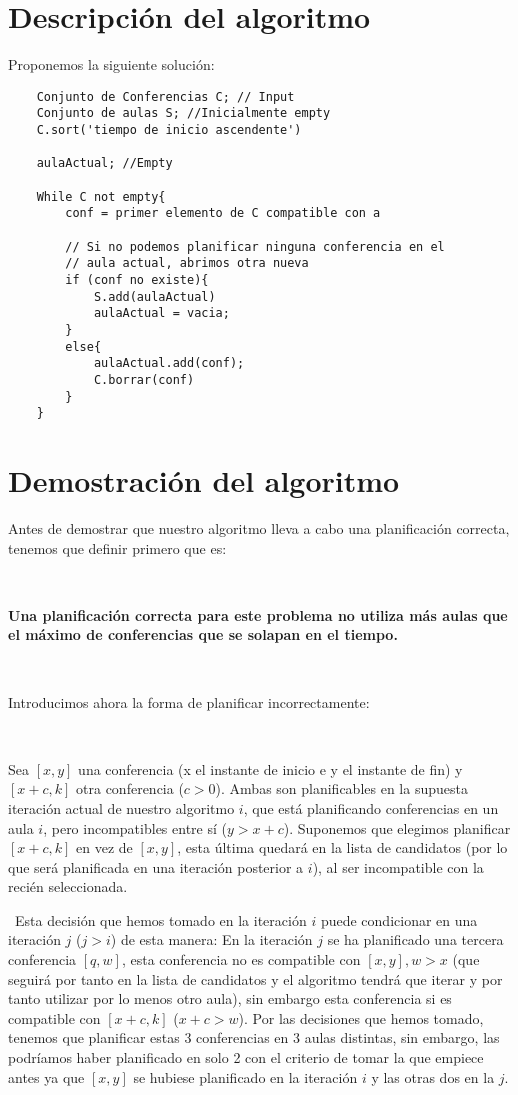 \documentclass{article}
\begin{document}
	\section{Descripción del algoritmo}
	Proponemos la siguiente solución:
	\begin{lstlisting}
	Conjunto de Conferencias C; // Input 
	Conjunto de aulas S; //Inicialmente empty
	C.sort('tiempo de inicio ascendente')
	
	aulaActual; //Empty
	
	While C not empty{
		conf = primer elemento de C compatible con a
		
		// Si no podemos planificar ninguna conferencia en el
		// aula actual, abrimos otra nueva
		if (conf no existe){
			S.add(aulaActual)
			aulaActual = vacia;
		}
		else{
 			aulaActual.add(conf);
			C.borrar(conf)
		}
	}
	\end{lstlisting}
	
	\section{Demostración del algoritmo}
	 Antes de demostrar que nuestro algoritmo lleva a cabo una planificación correcta, tenemos que definir primero que es:
	 
	 \
	 
	\textbf{ Una planificación correcta para este problema no utiliza más aulas que el máximo de conferencias que se solapan en el tiempo.}
	
	\
	
	Introducimos ahora la forma de planificar incorrectamente:
	
	\
	
	
	Sea $[x,y]$ una conferencia (x el instante de inicio e y el instante de fin) y $[x+c, k]$ otra conferencia ($c > 0$).
	Ambas son planificables en la supuesta iteración actual de nuestro algoritmo $i$, que está planificando conferencias en un aula $i$, pero incompatibles entre sí ($y > x+c$).
	Suponemos que elegimos planificar $[x+c, k]$ en vez de $[x, y]$, esta última quedará en la lista de candidatos (por lo que será planificada en una iteración posterior a $i$), al ser incompatible con la recién seleccionada.
	
	\
	Esta decisión que hemos tomado en la iteración $i$ puede condicionar en una iteración $j$ ($j > i$) de esta manera: En la iteración $j$ se ha planificado una tercera conferencia $[q, w]$, esta conferencia no es compatible con $[x,y], w > x$ (que seguirá por tanto en la lista de candidatos y el algoritmo tendrá que iterar y por tanto utilizar por lo menos otro aula), sin embargo esta conferencia si es compatible con $[x+c, k]$ ($x+c > w$). Por las decisiones que hemos tomado, tenemos que planificar estas 3 conferencias en 3 aulas distintas, sin embargo, las podríamos haber planificado en solo 2 con el criterio de tomar la que empiece antes ya que $[x,y]$ se hubiese planificado en la iteración $i$ y las otras dos en la $j$.
	
\end{document}
